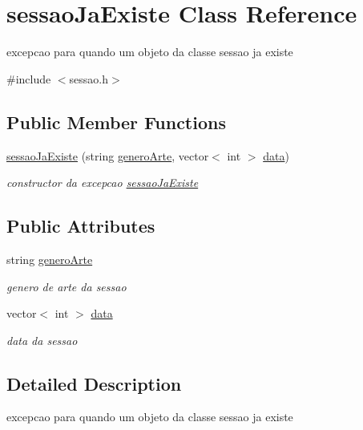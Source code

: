 \hypertarget{classsessaoJaExiste}{}\section{sessao\+Ja\+Existe Class Reference}
\label{classsessaoJaExiste}


excepcao para quando um objeto da classe sessao ja existe  




{\ttfamily \#include $<$sessao.\+h$>$}

\subsection*{Public Member Functions}
\begin{DoxyCompactItemize}
\item 
\hyperlink{classsessaoJaExiste_a0d90110fbef005844d1d711a7103ada2}{sessao\+Ja\+Existe} (string \hyperlink{classsessaoJaExiste_a9f0e4f38a0f1cebabdb28aa888e29dd2}{genero\+Arte}, vector$<$ int $>$ \hyperlink{classsessaoJaExiste_a7d8d84328e2b2dbd00336712d3341825}{data})
\begin{DoxyCompactList}\small\item\em constructor da excepcao \hyperlink{classsessaoJaExiste}{sessao\+Ja\+Existe} \end{DoxyCompactList}\end{DoxyCompactItemize}
\subsection*{Public Attributes}
\begin{DoxyCompactItemize}
\item 
string \hyperlink{classsessaoJaExiste_a9f0e4f38a0f1cebabdb28aa888e29dd2}{genero\+Arte}
\begin{DoxyCompactList}\small\item\em genero de arte da sessao \end{DoxyCompactList}\item 
vector$<$ int $>$ \hyperlink{classsessaoJaExiste_a7d8d84328e2b2dbd00336712d3341825}{data}
\begin{DoxyCompactList}\small\item\em data da sessao \end{DoxyCompactList}\end{DoxyCompactItemize}


\subsection{Detailed Description}
excepcao para quando um objeto da classe sessao ja existe 

